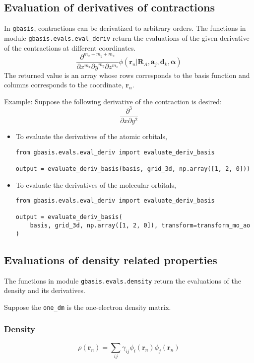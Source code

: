 \documentclass[letterpaper]{article}
\begin{document}
\subsection{Evaluation of derivatives of contractions}
In \verb|gbasis|, contractions can be derivatized to arbitrary orders.
The functions in module \verb|gbasis.evals.eval_deriv| return the evaluations of the
given derivative of the contractions at different coordinates.
\begin{equation}
  \frac{\partial^{m_x + m_y + m_z}}{\partial x^{m_x} \partial y^{m_y} \partial z^{m_z}}
  \phi(\mathbf{r}_n | \mathbf{R}_{A}, \mathbf{a}_j, \mathbf{d}_k, \boldsymbol{\alpha})
\end{equation}
The returned value is an array whose rows corresponds to the basis function and
columns corresponds to the coordinate, $\mathbf{r}_n$.

Example:
Suppose the following derivative of the contraction is desired:
\begin{equation}
  \frac{\partial^3}{\partial x \partial y^2}
\end{equation}
\begin{itemize}
\item To evaluate the derivatives of the atomic orbitals,
  \begin{lstlisting}[xleftmargin=-25pt]
from gbasis.evals.eval_deriv import evaluate_deriv_basis

output = evaluate_deriv_basis(basis, grid_3d, np.array([1, 2, 0]))
\end{lstlisting}
\item To evaluate the derivatives of the molecular orbitals,
  \begin{lstlisting}[xleftmargin=-25pt]
from gbasis.evals.eval_deriv import evaluate_deriv_basis

output = evaluate_deriv_basis(
    basis, grid_3d, np.array([1, 2, 0]), transform=transform_mo_ao
)
\end{lstlisting}
\end{itemize}
\subsection{Evaluations of density related properties}
The functions in module \verb|gbasis.evals.density| return the evaluations of the
density and its derivatives.

Suppose the \verb|one_dm| is the one-electron density matrix.
\subsubsection{Density}
\begin{equation}
  \rho(\mathbf{r}_n) = \sum_{ij} \gamma_{ij} \phi_i(\mathbf{r}_n) \phi_j(\mathbf{r}_n)
\end{equation}
\end{document}

